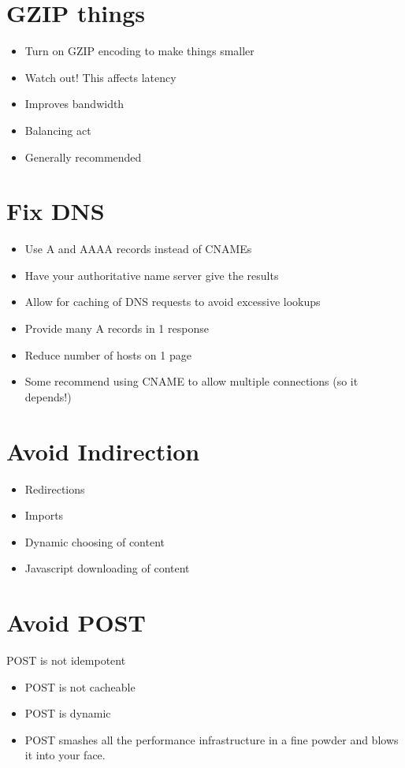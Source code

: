 \documentclass[../CMPUT-404-Notes.tex]{subfiles}
\begin{document}
\section{GZIP things}
\begin{itemize}
    \item Turn on GZIP encoding to make things smaller
    \item Watch out! This affects latency
    \item Improves bandwidth
    \item Balancing act
    \item Generally recommended
\end{itemize}

\section{Fix DNS}
\begin{itemize}
    \item Use A and AAAA records instead of CNAMEs
    \item Have your authoritative name server give the results
    \item Allow for caching of DNS requests to avoid excessive lookups
    \item Provide many A records in 1 response
    \item Reduce number of hosts on 1 page
    \item Some recommend using CNAME to allow multiple connections (so it depends!)
\end{itemize} 

\section{Avoid Indirection}
\begin{itemize}
    \item Redirections
    \item Imports
    \item Dynamic choosing of content
    \item Javascript downloading of content
\end{itemize}
    
\section{Avoid POST}
POST is not idempotent
\begin{itemize}
    \item POST is not cacheable
    \item POST is dynamic
    \item POST smashes all the performance
    infrastructure in a fine powder and blows it
    into your face.
\end{itemize}
    
\end{document}
